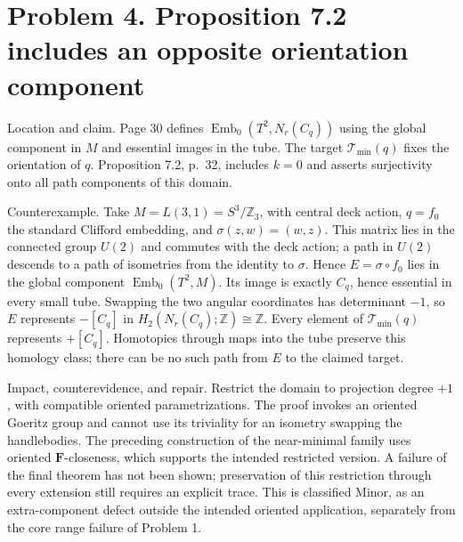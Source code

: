 \documentclass[10pt]{article}
\begin{document}
\section*{Problem 4. Proposition 7.2 includes an opposite orientation component}
Location and claim. Page 30 defines \(\operatorname{Emb}_0(T^2,N_r(C_q))\) using the global component in \(M\) and essential images in the tube. The target \(\mathcal T_{\min}(q)\) fixes the orientation of \(q\). Proposition 7.2, p. 32, includes \(k=0\) and asserts surjectivity onto all path components of this domain.\par
Counterexample. Take \(M=L(3,1)=S^3/\mathbb Z_3\), with central deck action, \(q=f_0\) the standard Clifford embedding, and \(\sigma(z,w)=(w,z)\). This matrix lies in the connected group \(U(2)\) and commutes with the deck action; a path in \(U(2)\) descends to a path of isometries from the identity to \(\sigma\). Hence \(E=\sigma\circ f_0\) lies in the global component \(\operatorname{Emb}_0(T^2,M)\). Its image is exactly \(C_q\), hence essential in every small tube. Swapping the two angular coordinates has determinant \(-1\), so \(E\) represents \(-[C_q]\) in \(H_2(N_r(C_q);\mathbb Z)\cong\mathbb Z\). Every element of \(\mathcal T_{\min}(q)\) represents \(+[C_q]\). Homotopies through maps into the tube preserve this homology class; there can be no such path from \(E\) to the claimed target.\par
Impact, counterevidence, and repair. Restrict the domain to projection degree \(+1\), with compatible oriented parametrizations. The proof invokes an oriented Goeritz group and cannot use its triviality for an isometry swapping the handlebodies. The preceding construction of the near-minimal family uses oriented \(\mathbf F\)-closeness, which supports the intended restricted version. A failure of the final theorem has not been shown; preservation of this restriction through every extension still requires an explicit trace. This is classified Minor, as an extra-component defect outside the intended oriented application, separately from the core range failure of Problem 1.\par
\end{document}
